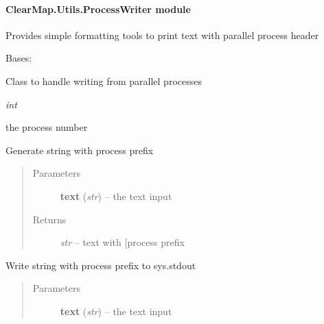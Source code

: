 \documentclass[letterpaper,10pt,english]{sphinxmanual}
\begin{document}
\paragraph{ClearMap.Utils.ProcessWriter module}
\label{api/ClearMap.Utils:module-ClearMap.Utils.ProcessWriter}\label{api/ClearMap.Utils:clearmap-utils-processwriter-module}
Provides simple formatting tools to print text with parallel process header

\begin{fulllineitems}
\label{api/ClearMap.Utils:ClearMap.Utils.ProcessWriter.ProcessWriter}
Bases: 

Class to handle writing from parallel processes

\begin{fulllineitems}
\label{api/ClearMap.Utils:ClearMap.Utils.ProcessWriter.ProcessWriter.process}
\emph{int}

the process number

\end{fulllineitems}


\begin{fulllineitems}
\label{api/ClearMap.Utils:ClearMap.Utils.ProcessWriter.ProcessWriter.writeString}
Generate string with process prefix
\begin{quote}\begin{description}
\item[{Parameters}] \leavevmode
\textbf{text} (\emph{str}) --
the text input

\item[{Returns}] \leavevmode
\emph{str} --
text with {[}process prefix

\end{description}\end{quote}

\end{fulllineitems}


\begin{fulllineitems}
\label{api/ClearMap.Utils:ClearMap.Utils.ProcessWriter.ProcessWriter.write}
Write string with process prefix to sys.stdout
\begin{quote}\begin{description}
\item[{Parameters}] \leavevmode
\textbf{text} (\emph{str}) --
the text input

\end{description}\end{quote}

\end{fulllineitems}


\end{fulllineitems}
\end{document}
